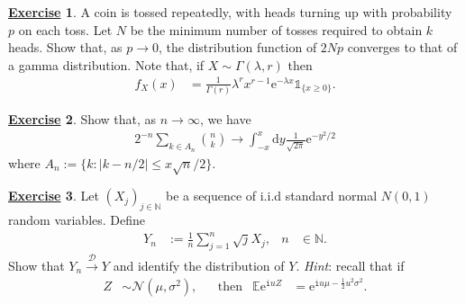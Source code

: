 \documentclass[12pt]{book}
\numberwithin{equation}{chapter}
\theoremstyle{plain}
\numberwithin{theorem}{section}
\theoremstyle{definition}
\newtheorem{exercise}{\underline{Exercise}}
\numberwithin{exercise}{chapter}
\newcommand{\<}{\langle}
\renewcommand{\>}{\rangle}
\renewcommand{\(}{\left(}
\renewcommand{\)}{\right)}
\renewcommand{\[}{\left[}
\renewcommand{\]}{\right]}
\newcommand\Eb{\mathds{E}}
\newcommand\Ib{\mathds{1}} 	%
\newcommand\Nb{\mathds{N}}
\newcommand\Dc{\mathscr{D}}
\newcommand\Nc{\mathscr{N}}
\newcommand\sig{\sigma}
\newcommand\Gam{\Gamma}
\newcommand\lam{\lambda}
\newcommand\ii{\mathtt{i}}
\newcommand\dd{\mathrm{d}}
\newcommand\ee{\mathrm{e}}
\begin{document}
\begin{exercise}
\label{exer:3.7}
A coin is tossed repeatedly, with heads turning up with probability $p$ on each toss.  Let $N$ be the minimum number of tosses required to obtain $k$ heads.  Show that, as $p \to 0$, the distribution function of $2Np$ converges to that of a gamma distribution.  Note that, if $X \sim \Gam(\lam,r)$ then
\begin{align}
f_X(x)
	&=	\frac{1}{\Gam(r)} \lam^r x^{r-1} \ee^{-\lam x} \Ib_{\{x \geq 0\}} .
\end{align}
\end{exercise}

\begin{exercise}
\label{exer:3.8}
Show that, as $n  \to \infty$, we have
\begin{align}
2^{-n} \sum_{k \in A_n} \binom{n}{k} \to \int_{-x}^x \dd y \frac{1}{\sqrt{2\pi}} \ee^{-y^2/2}
\end{align}
where $A_n := \{ k : |k - n/2| \leq x \sqrt{n} /2 \}$.
\end{exercise}

\begin{exercise}
\label{exer:3.9}
Let $(X_j)_{j \in \Nb}$ be a sequence of i.i.d standard normal $N(0,1)$ random variables.  Define
\begin{align}
Y_n
	&:=	\frac{1}{n} \sum_{j=1}^n \sqrt{j} X_j , &
n
	&\in \Nb .
\end{align}
Show that $Y_n \stackrel{\Dc}{\to} Y$ and identify the distribution of $Y$.  \textit{Hint}: recall that if
\begin{align}
Z 
	&\sim \Nc(\mu,\sig^2) , &
	&\text{then}&
\Eb \ee^{\ii u Z}
	&=	\ee^{\ii u \mu - \tfrac{1}{2} u^2 \sig^2} .
\end{align}
\end{exercise}
\end{document}
